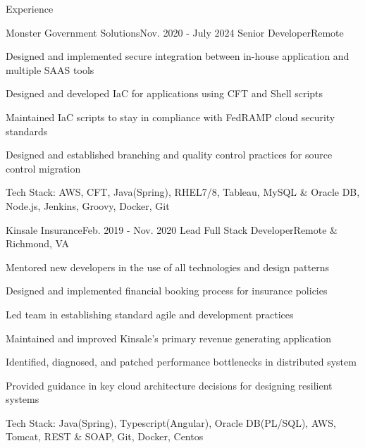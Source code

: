 \documentclass{resume} %
\begin{document}

\begin{rSection}{\vspace{-1em}Experience}

	\begin{rSubsection}{Monster Government Solutions}{Nov. 2020 - July 2024}
			{Senior Developer}{Remote}
		\item Designed and implemented secure integration between in-house application and multiple SAAS tools
		\item Designed and developed IaC for applications using CFT and Shell scripts
		\item Maintained IaC scripts to stay in compliance with FedRAMP cloud security standards
		\item Designed and established branching and quality control practices for source control migration
		\item Tech Stack: AWS, CFT, Java(Spring), RHEL7/8, Tableau, MySQL \& Oracle DB, Node.js, Jenkins, Groovy, Docker, Git
	\end{rSubsection}\vspace{-0.5em}
	
	\begin{rSubsection}{Kinsale Insurance}{Feb. 2019 - Nov. 2020}
			{Lead Full Stack Developer}{Remote \& Richmond, VA}
		\item Mentored new developers in the use of all technologies and design patterns
		\item Designed and implemented financial booking process for insurance policies
		\item Led team in establishing standard agile and development practices
	    \item Maintained and improved Kinsale's primary revenue generating application
		\item Identified, diagnosed, and patched performance bottlenecks in distributed system
		\item Provided guidance in key cloud architecture decisions for designing resilient systems
		\item Tech Stack: Java(Spring), Typescript(Angular), Oracle DB(PL/SQL), AWS, Tomcat, REST \& SOAP, Git, Docker, Centos
	\end{rSubsection}\vspace{-0.5em}



\end{rSection}
\end{document}
